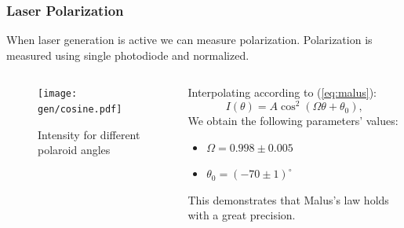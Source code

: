 \documentclass{beamer}
\begin{document}
	
	\begin{frame}
		\frametitle{Laser Polarization}
		When laser generation is active we can measure polarization. Polarization is measured using single photodiode and normalized.
		\vspace{-20pt}
		\begin{columns}
			\begin{column}{0.6\textwidth}
				\begin{figure}
					\centering
					\texttt{[image: gen/cosine.pdf]}
					\caption{Intensity for different polaroid angles}
				\end{figure}
			\end{column}
			\begin{column}{0.4\textwidth}
				Interpolating according to (\ref{eq:malus}):
				$$I(\theta) = A \cos^2{(\Omega \theta + \theta_0)},$$
				We obtain the following parameters' values: 
				
				\begin{itemize}
					\item[] $\Omega = 0.998 \pm 0.005$
					\item[] $\theta_0 = (-70 \pm 1)^\circ$
				\end{itemize}
			
			This demonstrates that Malus's law holds with a great precision.
			\end{column}
		\end{columns}
		
		
	\end{frame}
\end{document}

